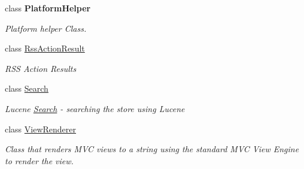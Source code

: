 \begin{DoxyCompactItemize}
class {\bfseries Platform\+Helper}
\begin{DoxyCompactList}\small\item\em Platform helper Class. \end{DoxyCompactList}\item 
class \hyperlink{class_open_1_1_g_i_1_1hypermart_1_1_helpers_1_1_rss_action_result}{Rss\+Action\+Result}
\begin{DoxyCompactList}\small\item\em R\+SS Action Results \end{DoxyCompactList}\item 
class \hyperlink{class_open_1_1_g_i_1_1hypermart_1_1_helpers_1_1_search}{Search}
\begin{DoxyCompactList}\small\item\em Lucene \hyperlink{class_open_1_1_g_i_1_1hypermart_1_1_helpers_1_1_search}{Search} -\/ searching the store using Lucene \end{DoxyCompactList}\item 
class \hyperlink{class_open_1_1_g_i_1_1hypermart_1_1_helpers_1_1_view_renderer}{View\+Renderer}
\begin{DoxyCompactList}\small\item\em Class that renders M\+VC views to a string using the standard M\+VC View Engine to render the view. \end{DoxyCompactList}\end{DoxyCompactItemize}
